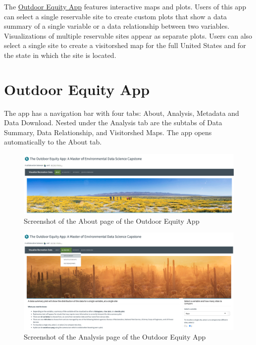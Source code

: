 \documentclass[
  11 pt,
  openany]{book}
\begin{document}
The \href{https://shinyapps.bren.ucsb.edu/oe_app/}{Outdoor Equity App} features interactive maps and plots. Users of this app can select a single reservable site to create custom plots that show a data summary of a single variable or a data relationship between two variables. Visualizations of multiple reservable sites appear as separate plots. Users can also select a single site to create a visitorshed map for the full United States and for the state in which the site is located.

\hypertarget{outdoor-equity-app}{%
\section{Outdoor Equity App}\label{outdoor-equity-app}}

The app has a navigation bar with four tabs: About, Analysis, Metadata and Data Download. Nested under the Analysis tab are the subtabs of Data Summary, Data Relationship, and Visitorshed Maps. The app opens automatically to the About tab.

\begin{figure}
\includegraphics[width=5.96in]{images/screenshot_about} \caption{Screenshot of the About page of the Outdoor Equity App}\label{fig:app-screenshot1}
\end{figure}

\begin{figure}
\includegraphics[width=5.98in]{images/screenshot_data-summary} \caption{Screenshot of the Analysis page of the Outdoor Equity App}\label{fig:app-screenshot2}
\end{figure}
\end{document}
